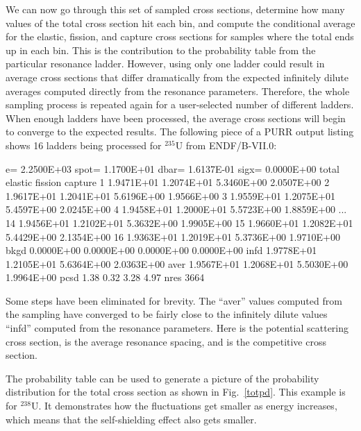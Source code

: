 We can now go through this set of sampled cross sections,
determine how many values of the total cross section hit each bin,
and compute the conditional average for the elastic, fission, and
capture cross sections for samples where the total ends up in each
bin.  This is the contribution to the probability table from the
particular resonance ladder.  However, using only one ladder could
result in average cross sections that differ dramatically from the
expected infinitely dilute averages computed directly from the
resonance parameters.  Therefore, the whole sampling process is
repeated again for a user-selected number of different ladders.
When enough ladders have been processed, the average cross sections
will begin to converge to the expected results.  The following
piece of a PURR output listing shows 16 ladders being processed for
$^{235}$U from ENDF/B-VII.0:

\newpage
\small
\begin{ccode}

e= 2.2500E+03   spot= 1.1700E+01   dbar= 1.6137E-01   sigx= 0.0000E+00
             total     elastic     fission     capture
     1  1.9471E+01  1.2074E+01  5.3460E+00  2.0507E+00
     2  1.9617E+01  1.2041E+01  5.6196E+00  1.9566E+00
     3  1.9559E+01  1.2075E+01  5.4597E+00  2.0245E+00
     4  1.9458E+01  1.2000E+01  5.5723E+00  1.8859E+00
   ...
    14  1.9456E+01  1.2102E+01  5.3632E+00  1.9905E+00
    15  1.9660E+01  1.2082E+01  5.4429E+00  2.1354E+00
    16  1.9363E+01  1.2019E+01  5.3736E+00  1.9710E+00
  bkgd  0.0000E+00  0.0000E+00  0.0000E+00  0.0000E+00
  infd  1.9778E+01  1.2105E+01  5.6364E+00  2.0363E+00
  aver  1.9567E+01  1.2068E+01  5.5030E+00  1.9964E+00
  pcsd        1.38        0.32        3.28        4.97
  nres        3664

\end{ccode}
\normalsize

\noindent
Some steps have been eliminated for brevity.  The ``aver'' values
computed from the sampling have converged to be fairly close to the
infinitely dilute values ``infd'' computed from the resonance
parameters.  Here  is the potential scattering cross
section,  is the average resonance spacing, and
 is the competitive cross section.

The probability table can be used to generate a picture of the
probability distribution for the total cross section as shown
in Fig.~\ref{totpd}.  This example is for $^{238}$U.  It demonstrates
how the fluctuations get smaller as energy increases, which means
that the self-shielding effect also gets smaller.


